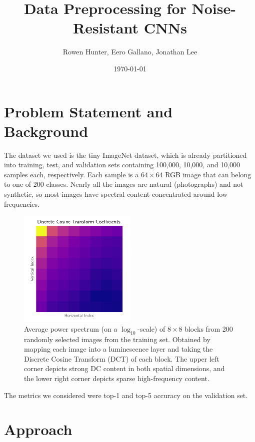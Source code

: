 \documentclass[justified]{article}
\begin{document}
  \title{Data Preprocessing for Noise-Resistant CNNs}
  \author{Rowen Hunter, Eero Gallano, Jonathan Lee}
  \date{\today}
  \maketitle

  \section{Problem Statement and Background}

  The dataset we used is the tiny ImageNet dataset, which is already partitioned into training, test, and validation sets containing 100,000, 10,000, and 10,000 samples each, respectively.
  Each sample is a $64 \times 64$ RGB image that can belong to one of 200 classes.
  Nearly all the images are natural (photographs) and not synthetic, so most images have spectral content concentrated around low frequencies.

  \begin{figure}[H]
    \centering
    \includegraphics[width=0.5\textwidth]{figures/dct}
    \caption{
      Average power spectrum (on a $\log_{10}$-scale) of $8 \times 8$ blocks from 200 randomly selected images from the training set.
      Obtained by mapping each image into a luminescence layer and taking the Discrete Cosine Transform (DCT) of each block.
      The upper left corner depicts strong DC content in both spatial dimensions, and the lower right corner depicts sparse high-frequency content.
    }
  \end{figure}

  The metrics we considered were top-1 and top-5 accuracy on the validation set.

  \section{Approach}
\end{document}

